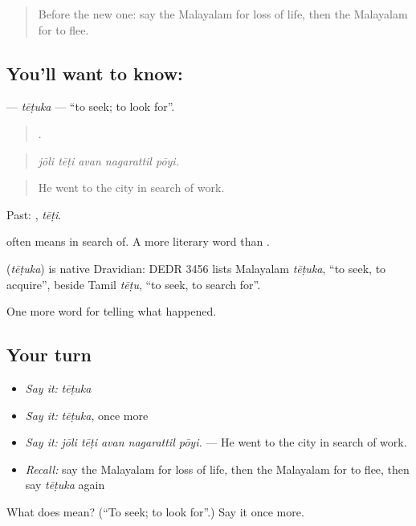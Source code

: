 \begin{quote}
Before the new one: say the Malayalam for loss of life, then the Malayalam for to flee.
\end{quote}

\subsection*{You'll want to know: }
\textbf{} — \emph{tēṭuka} — \textquotedblleft{}to seek; to look for\textquotedblright{}.

\begin{quote}
    .
\end{quote}

\begin{quote}
\emph{jōli tēṭi avan nagarattil pōyi.}
\end{quote}

\begin{quote}
He went to the city in search of work.
\end{quote}

Past: , \emph{tēṭi}.

 often means in search of. A more literary word than .

\begin{cousinweb}
\textbf{} (\emph{tēṭuka}) is native Dravidian: DEDR 3456 lists Malayalam \emph{tēṭuka}, \textquotedblleft{}to seek, to acquire\textquotedblright{}, beside Tamil \emph{tēṭu}, \textquotedblleft{}to seek, to search for\textquotedblright{}.
\end{cousinweb}

\begin{grammarlens}[title={What you've built}]
One more word for telling what happened.
\end{grammarlens}

\subsection*{Your turn}
\begin{itemize}
\raggedright
  \item \emph{Say it:} \emph{tēṭuka}
  \item \emph{Say it:} \emph{tēṭuka}, once more
  \item \emph{Say it:} \emph{jōli tēṭi avan nagarattil pōyi.} — He went to the city in search of work.
  \item \emph{Recall:} say the Malayalam for loss of life, then the Malayalam for to flee, then say \emph{tēṭuka} again
\end{itemize}

\begin{tcolorbox}[breakable,colback=teal!4,colframe=teal!35!black,title={Before you move on}]
What does  mean? (\textquotedblleft{}To seek; to look for\textquotedblright{}.) Say it once more.
\end{tcolorbox}
